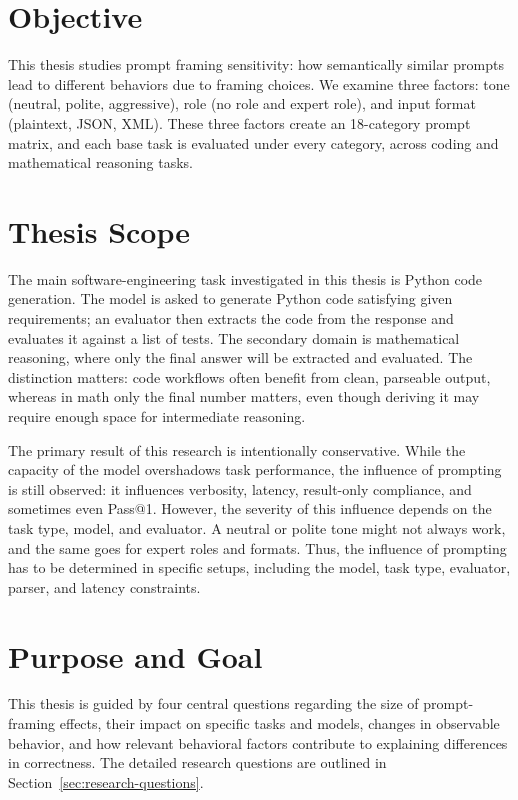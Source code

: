 \section{Objective}

This thesis studies prompt framing sensitivity: how semantically similar prompts lead to different behaviors due to framing choices. We examine three factors: tone (neutral, polite, aggressive), role (no role and expert role), and input format (plaintext, JSON, XML). These three factors create an 18-category prompt matrix, and each base task is evaluated under every category, across coding and mathematical reasoning tasks.

\section{Thesis Scope}

The main software-engineering task investigated in this thesis is Python code generation. The model is asked to generate Python code satisfying given requirements; an evaluator then extracts the code from the response and evaluates it against a list of tests. The secondary domain is mathematical reasoning, where only the final answer will be extracted and evaluated. The distinction matters: code workflows often benefit from clean, parseable output, whereas in math only the final number matters, even though deriving it may require enough space for intermediate reasoning.

The primary result of this research is intentionally conservative. While the capacity of the model overshadows task performance, the influence of prompting is still observed: it influences verbosity, latency, result-only compliance, and sometimes even Pass@1. However, the severity of this influence depends on the task type, model, and evaluator. A neutral or polite tone might not always work, and the same goes for expert roles and formats. Thus, the influence of prompting has to be determined in specific setups, including the model, task type, evaluator, parser, and latency constraints.

\section{Purpose and Goal\label{sec:purpose_and_goal}}

This thesis is guided by four central questions regarding the size of prompt-framing effects, their impact on specific tasks and models, changes in observable behavior, and how relevant behavioral factors contribute to explaining differences in correctness. The detailed research questions are outlined in Section~\ref{sec:research-questions}.

